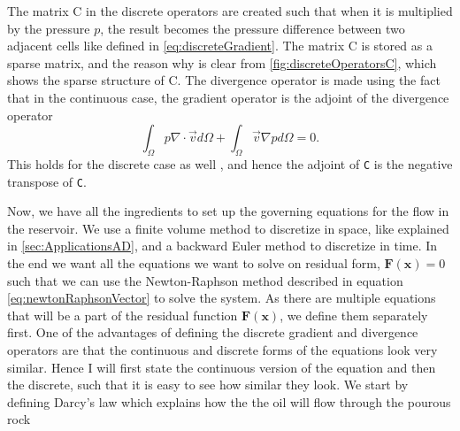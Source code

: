 The matrix C in the discrete operators are created such that when it is multiplied by the pressure $p$, the result becomes the pressure difference between two adjacent cells like defined in \eqref{eq:discreteGradient}. The matrix C is stored as a sparse matrix, and the reason why is clear from \autoref{fig:discreteOperatorsC}, which shows the sparse  structure of C. The divergence operator is made using the fact that in the continuous case, the gradient operator is the adjoint of the divergence operator
\begin{equation*}
    \int_\Omega p\nabla \cdot \vec{v} d\Omega + \int_\Omega \vec{v}\nabla p d\Omega = 0.
\end{equation*}
This holds for the discrete case as well \emph{\citep{lieMrstUrl}}, and hence the adjoint of \texttt{C} is the negative transpose of \texttt{C}.

Now, we have all the ingredients to set up the governing equations for the flow in the reservoir. We use a finite volume method to discretize in space, like explained in \autoref{sec:ApplicationsAD}, and a backward Euler method to discretize in time. In the end we want all the equations we want to solve on residual form, $\boldsymbol{F}(\boldsymbol{x}) = 0$ such that we can use the Newton-Raphson method described in equation \eqref{eq:newtonRaphsonVector} to solve the system. As there are multiple equations that will be a part of the residual function $\boldsymbol{F}(\boldsymbol{x})$, we define them separately first. One of the advantages of defining the discrete gradient and divergence operators are that the continuous and discrete forms of the equations look very similar. Hence I will first state the continuous version of the equation and then the discrete, such that it is easy to see how similar they look. We start by defining Darcy's law which explains how the the oil will flow through the pourous rock

